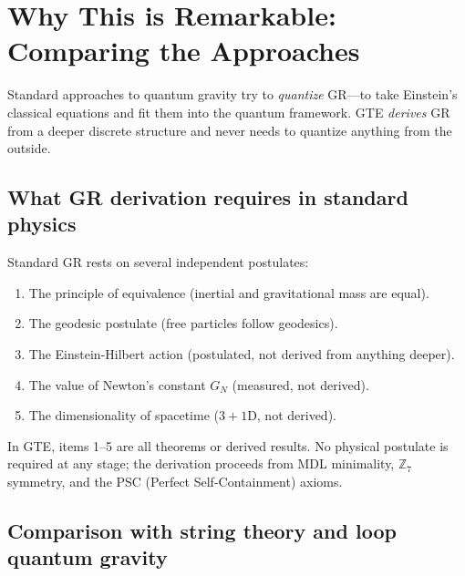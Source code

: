 \documentclass[11pt,a4paper]{article}
\newcommand{\GN}{G_{\!N}}
\newcommand{\ZS}{\mathbb{Z}_7}
\begin{document}
\section{Why This is Remarkable: Comparing the Approaches}

\begin{tcolorbox}[colback=boxblue,colframe=blue!40!black,
  title=The key contrast]
Standard approaches to quantum gravity try to \emph{quantize} GR---to take
Einstein's classical equations and fit them into the quantum framework.
GTE \emph{derives} GR from a deeper discrete structure and never needs to quantize
anything from the outside.
\end{tcolorbox}

\subsection{What GR derivation requires in standard physics}

Standard GR rests on several independent postulates:
\begin{enumerate}[nosep,leftmargin=2em]
\item The principle of equivalence (inertial and gravitational mass are equal).
\item The geodesic postulate (free particles follow geodesics).
\item The Einstein-Hilbert action (postulated, not derived from anything deeper).
\item The value of Newton's constant $\GN$ (measured, not derived).
\item The dimensionality of spacetime ($3+1$D, not derived).
\end{enumerate}

In GTE, items 1--5 are all theorems or derived results.
No physical postulate is required at any stage; the derivation proceeds from
MDL minimality, $\ZS$ symmetry, and the PSC (Perfect Self-Containment) axioms.

\subsection{Comparison with string theory and loop quantum gravity}
\end{document}

